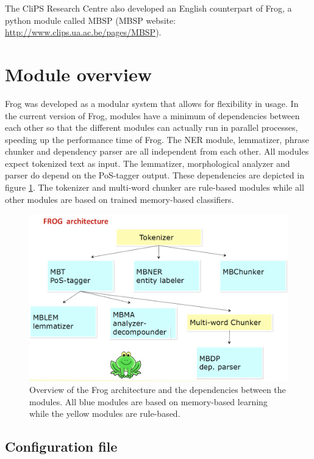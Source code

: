 \documentclass{book}
\begin{document}
The CliPS Research Centre also developed an English counterpart of Frog, a python module called MBSP (MBSP website: \url{http://www.clips.ua.ac.be/pages/MBSP}).

\section{Module overview}

Frog was developed as a modular system that allows for flexibility in usage.
In the current version of Frog, modules have a minimum of dependencies between each other so that the different modules can actually run in parallel processes, speeding up the performance time of Frog. The NER module, lemmatizer, phrase chunker and dependency parser are all independent from each other. All modules expect tokenized text as input. The lemmatizer, morphological analyzer and parser do depend on the PoS-tagger output.
These dependencies are depicted in figure \ref{fig-arch}. The tokenizer and multi-word chunker are rule-based modules while all other modules are based on trained memory-based classifiers.


\begin{figure}[ht]
  \centering
   \includegraphics[scale=0.3]{frogarchitecture}
  \caption{Overview of the Frog architecture and the dependencies between the modules. All blue modules are based on memory-based learning while the yellow modules are rule-based.}
  \label{fig-arch}
\end{figure}

\subsection{Configuration file}
\end{document}
